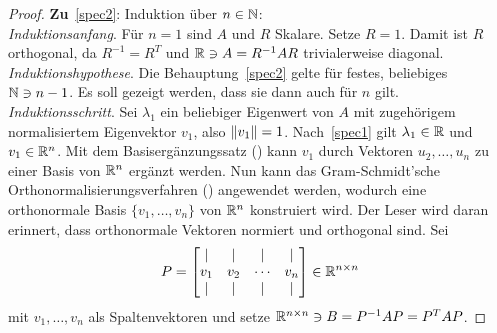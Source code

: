 \begin{proof}
    \textbf{Zu}~\ref{spec2}: Induktion über \(n \in \mathbb{N}\): \\
    \textit{Induktionsanfang}. 
    Für \(n=1\) sind \(A\) und \(R\) Skalare. 
    Setze \(R=1\). 
    Damit ist \(R\) orthogonal, da \(R^{-1}=R^{T}\) und \(\mathbb{R} \ni A = R^{-1}AR\) trivialerweise diagonal. \\
    \textit{Induktionshypothese}. 
    Die Behauptung~\ref{spec2} gelte für festes, beliebiges \(\mathbb{N} \ni n-1\). 
    Es soll gezeigt werden, dass sie dann auch für \(n\) gilt.  \\
    \textit{Induktionsschritt}.  
    Sei \(\lambda_1\) ein beliebiger Eigenwert von \(A\) mit zugehörigem normalisiertem Eigenvektor \(v_1\), also \(\lVert v_1\rVert = 1\).  
    Nach~\ref{spec1} gilt \(\lambda_1 \in \mathbb{R}\) und \(v_1 \in \mathbb{R}^{n}\). 
    Mit dem Basisergänzungssatz () kann \(v_1\) durch Vektoren \(u_2,\ldots,u_n\) zu einer Basis von \(\mathbb{R}^{n}\) ergänzt werden. 
    Nun kann das Gram-Schmidt’sche Orthonormalisierungsverfahren () angewendet werden, wodurch eine orthonormale Basis \(\{v_1,\ldots,v_n\}\) von \(\mathbb{R}^{n}\) konstruiert wird.  
    Der Leser wird daran erinnert, dass orthonormale Vektoren normiert und orthogonal sind.
    Sei 
    \begin{equation*}
        P = 
        \begin{bmatrix}
            \vert & \vert & \vert & \vert\\
            v_1 & v_2 & \cdots & v_n \\
            \vert & \vert & \vert & \vert
        \end{bmatrix} 
        \in \mathbb{R} ^{n \times n}
    \end{equation*} 
    mit \(v_1,\ldots,v_n\) als Spaltenvektoren und setze \(\mathbb{R}^{n \times n} \ni B = P^{-1}AP = P^{T}AP\).


\end{proof}

